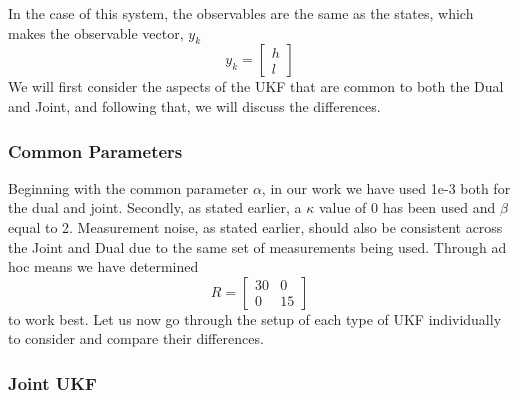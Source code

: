 In the case of this system, the observables are the same as the states, which makes the observable vector, $y_k$
\begin{equation}
y_k = 
\begin{bmatrix}
h\\
l
\end{bmatrix}
\end{equation}
We will first consider the aspects of the UKF that are common to both the Dual and Joint, and following that, we will discuss the differences.

\subsubsection{Common Parameters}
Beginning with the common parameter $\alpha$, in our work we have used 1e-3 both for the dual and joint. Secondly, as stated earlier, a $\kappa$ value of 0 has been used and $\beta$ equal to 2. Measurement noise, as stated earlier, should also be consistent across the Joint and Dual due to the same set of measurements being used. Through ad hoc means we have determined
\begin{equation}
R = \begin{bmatrix}
30 & 0\\0 & 15\end{bmatrix}
\end{equation}
to work best.
Let us now go through the setup of each type of UKF individually to consider and compare their differences.

\subsubsection{Joint UKF}

